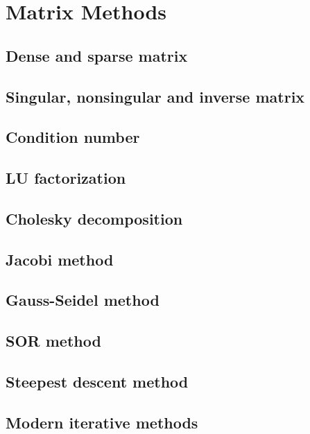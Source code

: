 \documentclass[article,A4,12pt]{llncs}
\begin{document}
\section{Matrix Methods}



\subsection{Dense and sparse matrix}


\subsection{Singular, nonsingular and inverse matrix}


\subsection{Condition number}


\subsection{LU factorization}


\subsection{Cholesky decomposition}


\subsection{Jacobi method}


\subsection{Gauss-Seidel method}


\subsection{SOR method}


\subsection{Steepest descent method}


\subsection{Modern iterative methods}
\end{document}
